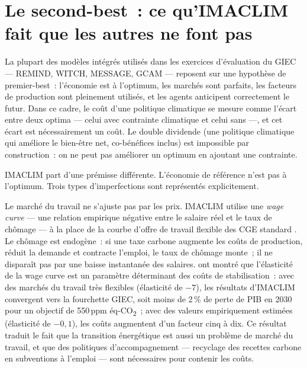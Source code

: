 \section{Le second-best~: ce qu'IMACLIM fait que les autres ne font pas}\label{sec:imaclim-secondbest}

La plupart des modèles intégrés utilisés dans les exercices d'évaluation du GIEC --- REMIND, WITCH, MESSAGE, GCAM --- reposent sur une hypothèse de premier-best~: l'économie est à l'optimum, les marchés sont parfaits, les facteurs de production sont pleinement utilisés, et les agents anticipent correctement le futur. Dans ce cadre, le coût d'une politique climatique se mesure comme l'écart entre deux optima --- celui avec contrainte climatique et celui sans ---, et cet écart est nécessairement un coût. Le double dividende (une politique climatique qui améliore le bien-être net, co-bénéfices inclus) est impossible par construction~: on ne peut pas améliorer un optimum en ajoutant une contrainte.

IMACLIM part d'une prémisse différente. L'économie de référence n'est pas à l'optimum. Trois types d'imperfections sont représentés explicitement.

Le marché du travail ne s'ajuste pas par les prix. IMACLIM utilise une \emph{wage curve} --- une relation empirique négative entre le salaire réel et le taux de chômage --- à la place de la courbe d'offre de travail flexible des CGE standard \parencite{blanchflower_introduction_1995}. Le chômage est endogène~: si une taxe carbone augmente les coûts de production, réduit la demande et contracte l'emploi, le taux de chômage monte~; il ne disparaît pas par une baisse instantanée des salaires. \textcite{guivarch_costs_2011} ont montré que l'élasticité de la wage curve est un paramètre déterminant des coûts de stabilisation~: avec des marchés du travail très flexibles (élasticité de $-7$), les résultats d'IMACLIM convergent vers la fourchette GIEC, soit moins de 2\,\% de perte de PIB en 2030 pour un objectif de 550\,ppm éq-CO\textsubscript{2}~; avec des valeurs empiriquement estimées (élasticité de $-0{,}1$), les coûts augmentent d'un facteur cinq à dix. Ce résultat traduit le fait que la transition énergétique est aussi un problème de marché du travail, et que des politiques d'accompagnement --- recyclage des recettes carbone en subventions à l'emploi --- sont nécessaires pour contenir les coûts.

